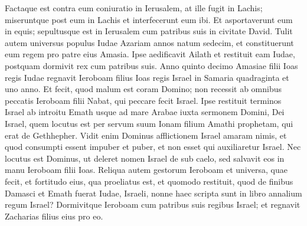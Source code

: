 \begin{biblechapter}
\begin{biblechapter}
\begin{biblechapter}
\begin{biblechapter}
\begin{biblechapter}
\begin{biblechapter}
\begin{biblechapter}
\begin{biblechapter}
\begin{biblechapter}
\begin{biblechapter}
\begin{biblechapter}
\begin{biblechapter}
\begin{biblechapter}
\begin{biblechapter}
\verse Factaque est contra eum coniuratio in Ierusalem, at ille fugit in Lachis; miseruntque post eum in Lachis et interfecerunt eum ibi. 
\verse Et asportaverunt eum in equis; sepultusque est in Ierusalem cum patribus suis in civitate David. 
\verse Tulit autem universus populus Iudae Azariam annos natum sedecim, et constituerunt eum regem pro patre eius Amasia. 
\verse Ipse aedificavit Ailath et restituit eam Iudae, postquam dormivit rex cum patribus suis.
 \verse Anno quinto decimo Amasiae filii Ioas regis Iudae regnavit Ieroboam filius Ioas regis Israel in Samaria quadraginta et uno anno. 
\verse Et fecit, quod malum est coram Domino; non recessit ab omnibus peccatis Ieroboam filii Nabat, qui peccare fecit Israel.
 \verse Ipse restituit terminos Israel ab introitu Emath usque ad mare Arabae iuxta sermonem Domini, Dei Israel, quem locutus est per servum suum Ionam filium Amathi prophetam, qui erat de Gethhepher. 
\verse Vidit enim Dominus afflictionem Israel amaram nimis, et quod consumpti essent impuber et puber, et non esset qui auxiliaretur Israel. 
\verse Nec locutus est Dominus, ut deleret nomen Israel de sub caelo, sed salvavit eos in manu Ieroboam filii Ioas.
 \verse Reliqua autem gestorum Ieroboam et universa, quae fecit, et fortitudo eius, qua proeliatus est, et quomodo restituit, quod de finibus Damasci et Emath fuerat Iudae, Israeli, nonne haec scripta sunt in libro annalium regum Israel? 
\verse Dormivitque Ieroboam cum patribus suis regibus Israel; et regnavit Zacharias filius eius pro eo.
 

\end{biblechapter}
\end{biblechapter}
\end{biblechapter}
\end{biblechapter}
\end{biblechapter}
\end{biblechapter}
\end{biblechapter}
\end{biblechapter}
\end{biblechapter}
\end{biblechapter}
\end{biblechapter}
\end{biblechapter}
\end{biblechapter}
\end{biblechapter}
